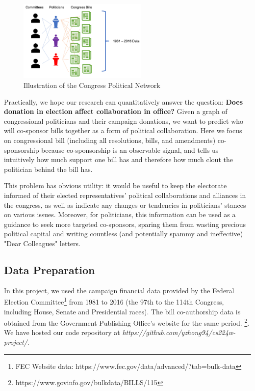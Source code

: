 \documentclass[12pt,twocolumn]{article}
\begin{document}
\begin{figure}[!t]
\centering
\includegraphics[width=2.5in]{network_illustration2}
\caption{Illustration of the Congress Political Network}
\label{fig_sim}
\end{figure}

Practically, we hope our research can quantitatively answer the question: \textbf{Does donation in election affect collaboration in office?} Given a graph of congressional politicians and their campaign donations, we want to predict who will co-sponsor bills together as a form of political collaboration. Here we focus on congressional bill (including all resolutions, bills, and amendments) co-sponsorship because co-sponsorship is an observable signal, and tells us intuitively how much support one bill has and therefore how much clout the politician behind the bill has. 

This problem has obvious utility: it would be useful to keep the electorate informed of their elected representatives' political collaborations and alliances in the congress, as well as indicate any changes or tendencies in politicians' stances on various issues. Moreover, for politicians, this information can be used as a guidance to seek more targeted co-sponsors, sparing them from wasting precious political capital and writing countless (and potentially spammy and ineffective) "Dear Colleagues" letters. 

\subsection{Data Preparation}
In this project, we used the campaign financial data provided by the Federal Election Committee\footnote{FEC Website data: https://www.fec.gov/data/advanced/?tab=bulk-data } from 1981 to 2016 (the 97th to the 114th Congress, including House, Senate and Presidential races). The bill co-authorship data is obtained from the Government Publishing Office's website for the same period. \footnote{https://www.govinfo.gov/bulkdata/BILLS/115}.  We have hosted our code repository at \textit{https://github.com/yzhong94/cs224w-project/}. 
\end{document}
